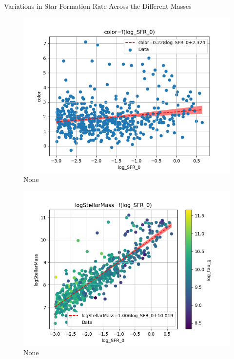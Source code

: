 \documentclass[presentation]{beamer}
\begin{document}
\begin{frame}[label={sec:orgbd7dd9c}]{Variations in Star Formation Rate Across the Different Masses}
\begin{figure}[!htpb]
\centering
\includegraphics[width=.9\linewidth]{./figs/log_SFR_0-color.png}
\caption{\label{fig:None}None}
\end{figure}


\begin{figure}[!htpb]
\centering
\includegraphics[width=.9\linewidth]{./figs/log_SFR_0-logStellarMass-color_log_tau_g.png}
\caption{\label{fig:None}None}
\end{figure}




\end{frame}
\end{document}
